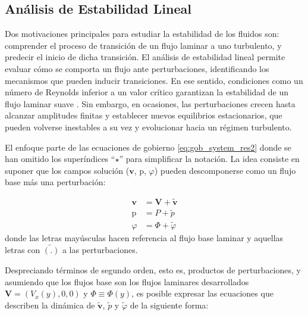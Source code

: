 \subsection{Análisis de Estabilidad Lineal} \label{sec:estabilidad}

Dos motivaciones principales para estudiar la estabilidad de los fluidos son: comprender el proceso de transición de un flujo laminar a uno turbulento, y predecir el inicio de dicha transición. El análisis de estabilidad lineal permite evaluar cómo se comporta un flujo ante perturbaciones, identificando los mecanismos que pueden inducir transiciones. En ese sentido, condiciones como un número de Reynolds inferior a un valor crítico garantizan la estabilidad de un flujo laminar suave \cite{drazin2004hydrodynamic}. Sin embargo, en ocasiones, las perturbaciones crecen hasta alcanzar amplitudes finitas y establecer nuevos equilibrios estacionarios, que pueden volverse inestables a su vez y evolucionar hacia un régimen turbulento. 

El enfoque parte de las ecuaciones de gobierno \ref{eq:gob_system_res2} donde se han omitido los superíndices ``${\star}$'' para simplificar la notación. La idea consiste en suponer que los campos solución \linebreak ($\mathbf{v}$, $\text{p}$, $\varphi$) pueden descomponerse como un flujo base más una perturbación:

\begin{align}
\mathbf{v} &= \mathbf{V} + \widetilde{\mathbf{v}} \\
\text{p} &= P + \widetilde{p} \\
\varphi &= \Phi + \widetilde{\varphi}
\end{align}  
donde las letras mayúsculas hacen referencia al flujo base laminar y aquellas letras con $\widetilde{(\text{.})}$ a las perturbaciones. 

Despreciando términos de segundo orden, esto es, productos de perturbaciones, y \linebreak asumiendo que los flujos base son los flujos laminares desarrollados $\mathbf{V} = (V_x(y),0,0)$ y $\Phi \equiv \Phi(y)$, es posible expresar las ecuaciones que describen la dinámica de $\widetilde{\mathbf{v}}$, $\widetilde{p}$ y $\widetilde{\varphi}$ de la siguiente forma: 

